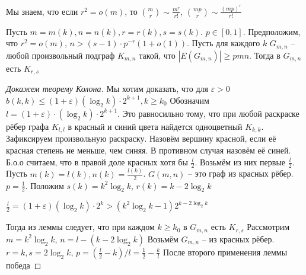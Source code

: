 \documentclass[document.tex]{subfiles}
\begin{document}
Мы знаем, что если $r^2 = o(m)$, то $\binom{m}{r} \sim \frac{m^r}{r!}$, $\binom{mp}{r} \sim \frac{(mp)^r}{r!}$

\begin{lemma}
    Пусть $m = m(k), n = n(k), r = r(k), s = s(k)$. $p \in [0, 1]$. Предположим, что $r^2 = o(m)$, $n > (s - 1) \cdot
    p^{-r} (1 + o(1))$. Пусть для каждого $k$ $G_{m, n}$ -- любой произвольный подграф $K_{m, n}$ такой, что
    $|E(G_{m, n})| \geq pmn$. Тогда в $G_{m, n}$ есть $K_{r, s}$
\end{lemma}

\begin{proof}[Докажем теорему Колона]
    Мы хотим доказать, что для $\varepsilon > 0$
    $b(k, k) \leq (1 + \varepsilon) (\log_2 k) \cdot 2^{k+1}, k \geq k_0$
    Обозначим $l = (1 + \varepsilon) \cdot (\log_2 k) \cdot 2^{k+1}$. Это равносильно тому, что при любой раскраске
    рёбер графа $K_{l, l}$ в красный и синий цвета найдется одноцветный $K_{k, k}$. Зафиксируем произвольную раскраску.
    Назовём вершину красной, если её красная степень не меньше, чем синяя. В противном случая назовём её синей.
    Б.о.о считаем, что в правой доле красных хотя бы $\frac{l}{2}$. Возьмём из них первые $\frac{l}{2}$. Пусть $m(k) =
    l(k), n(k) = \frac{l(k)}{2}$. $G(m, n)$ -- это граф из красных рёбер. $p = \frac{1}{2}$. Положим $s(k) = k^2 \log_2
    k$, $r(k) = k - 2\log_2 k$
    

    $\frac{l}{2} = (1 + \varepsilon)(\log_2 k) \cdot 2^{k} > (k^2 \log_2 k - 1) 2^{k - 2\log_2 k}$
    
    Тогда из леммы следует, что при каждом $k \geq k_0$ в $G_{m, n}$ есть $K_{r, s}$
    Рассмотрим $m = k^2 \log_2 k$, $n = l - (k - 2\log_2 k)$ Возьмём $G_{m, n}$ -- из красных рёбер. $r = k, s = 2\log_2
    k$, $p = (\frac{l}{2} - k) / l = \frac{1}{2} - \frac{k}{l}$ После второго применения леммы победа
\end{proof}
\end{document}
